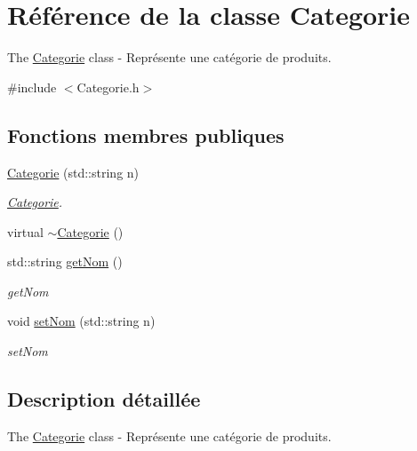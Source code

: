 \hypertarget{class_categorie}{\section{Référence de la classe Categorie}
\label{class_categorie}
}


The \hyperlink{class_categorie}{Categorie} class -\/ Représente une catégorie de produits.  




{\ttfamily \#include $<$Categorie.\-h$>$}

\subsection*{Fonctions membres publiques}
\begin{DoxyCompactItemize}
\item 
\hyperlink{class_categorie_ab7ef54581c3480eaa164f694eb934363}{Categorie} (std\-::string n)
\begin{DoxyCompactList}\small\item\em \hyperlink{class_categorie}{Categorie}. \end{DoxyCompactList}\item 
virtual \hyperlink{class_categorie_a7dd277a29ddea8656e9baf073d8a2a55}{$\sim$\-Categorie} ()
\item 
std\-::string \hyperlink{class_categorie_af6bde3e082e8bf1991616ef7021326d7}{get\-Nom} ()
\begin{DoxyCompactList}\small\item\em get\-Nom \end{DoxyCompactList}\item 
void \hyperlink{class_categorie_ad73a8841ac056863263d544c48ba7e29}{set\-Nom} (std\-::string n)
\begin{DoxyCompactList}\small\item\em set\-Nom \end{DoxyCompactList}\end{DoxyCompactItemize}


\subsection{Description détaillée}
The \hyperlink{class_categorie}{Categorie} class -\/ Représente une catégorie de produits. 

